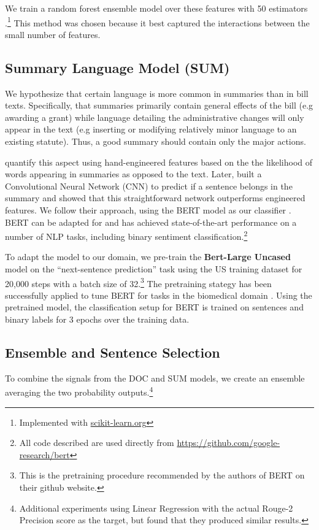 \documentclass[11pt,a4paper]{article}
\begin{document}
We train a random forest ensemble model over these features with 50 estimators \cite{Breiman:randomforest}.\footnote{Implemented with \url{scikit-learn.org}} This method was chosen because it best captured the interactions between the small number of features.

\subsection{Summary Language Model (SUM)}
\label{sec:sum}
We hypothesize that certain language is more common in summaries than in bill texts. Specifically, that summaries primarily contain general effects of the bill (e.g awarding a grant) while language detailing the administrative changes will only appear in the text (e.g inserting or modifying relatively minor language to an existing statute). Thus, a good summary should contain only  the major actions.

\citet{hong2014improving} quantify this aspect using hand-engineered features based on the the likelihood of words appearing in summaries as opposed to the text. Later, \citet{cao2015learning} built a Convolutional Neural Network (CNN) to predict if a sentence belongs in the summary and showed that this straightforward network outperforms engineered features. We follow their approach, using the BERT model as our classifier \cite{devlin2018bert}. BERT can be adapted for and has achieved state-of-the-art performance on a number of NLP tasks, including binary sentiment classification.\footnote{All code described are used directly from \url{https://github.com/google-research/bert}}


To adapt the model to our domain, we pre-train the \textbf{Bert-Large Uncased} model on the ``next-sentence prediction'' task using the US training dataset for 20,000 steps with a batch size of 32.\footnote{This is the pretraining procedure recommended by the authors of BERT on their github website.} The pretraining stategy has been successfully applied to tune BERT for tasks in the biomedical domain \cite{biobert}. Using the pretrained model, the classification setup for BERT is trained on sentences and binary labels for 3 epochs over the training data.

\subsection{Ensemble and Sentence Selection}
To combine the signals from the DOC and SUM models, we create an ensemble averaging the two probability outputs.\footnote{Additional experiments using Linear Regression with the actual Rouge-2 Precision score as the target, but found that they produced similar results.}
\end{document}
